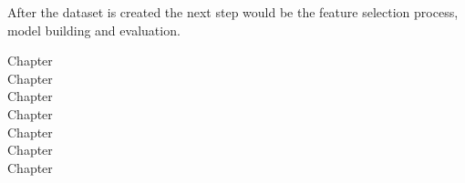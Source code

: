 After the dataset is created the next step would be the feature selection process, model building and evaluation.

Chapter \\
Chapter \\
Chapter \\
Chapter \\
Chapter \\
Chapter \\
Chapter \\